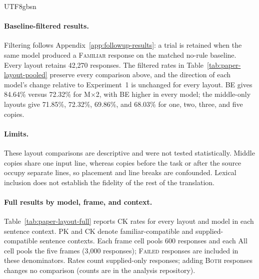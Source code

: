 \documentclass[11pt]{article}
\begin{document}
\begin{CJK*}{UTF8}{gbsn}
\paragraph{Baseline-filtered results.}
Filtering follows Appendix~\ref{app:followup-results}: a trial is retained when
the same model produced a \textsc{Familiar} response on the matched no-rule
baseline. Every layout retains 42,270 responses. The filtered rates in
Table~\ref{tab:paper-layout-pooled} preserve every comparison above, and the
direction of each model's change relative to Experiment~1 is unchanged for every
layout. BE gives 84.64\% versus 72.32\% for M$\times$2, with BE higher in every
model; the middle-only layouts give 71.85\%, 72.32\%, 69.86\%, and 68.03\% for
one, two, three, and five copies.

\paragraph{Limits.}
These layout comparisons are descriptive and were not tested statistically.
Middle copies share one input line, whereas copies before the task or after
the source occupy separate lines, so placement and line breaks are confounded.
Lexical inclusion does not establish the fidelity of the rest of the
translation.

\paragraph{Full results by model, frame, and context.}
Table~\ref{tab:paper-layout-full} reports CK rates for every layout and model
in each sentence context. PK and CK denote familiar-compatible and
supplied-compatible sentence contexts. Each frame cell pools 600 responses and
each All cell pools the five frames (3,000 responses); \textsc{Failed}
responses are included in these denominators. Rates count supplied-only
responses; adding \textsc{Both} responses changes no comparison (counts are in
the analysis repository).




\end{CJK*}
\end{document}
